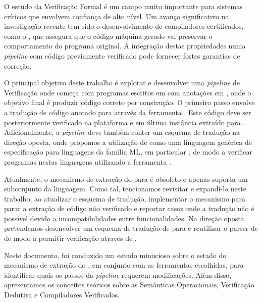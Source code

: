 
%

O estudo da Verificação Formal é um campo muito importante para sistemas críticos que
envolvem confiança de alto nível. Um avanço significativo na investigação recente tem sido o
desenvolvimento de compiladores certificados, como o \cml, que assegura que o código máquina
gerado vai preservar o comportamento do programa original. A integração destas propriedades
numa \textit{pipeline} com código previamente verificado pode fornecer fortes garantias de correção.

O principal objetivo deste trabalho é explorar e desenvolver uma \textit{pipeline} de Verificação
onde começa com programas escritos em \ocaml com anotações em \gospel, onde o objetivo final
é produzir código \cml correto por construção. O primeiro passo envolve a tradução de código 
\ocaml anotado para \whyml através da ferramenta \cameleer. Este código \whyml deve ser 
posteriormente verificado na plataforma \whythree e em última instância extraído para \cml.
Adicionalmente, a \textit{pipeline} deve também conter um esquema de tradução na direção oposta,
onde propomos a utilização de \gospel como uma linguagem genérica de especificação para linguagens
da família ML, em particular \cml, de modo a verificar programas nestas linguagens utilizando
a ferramenta \cameleer.

Atualmente, o mecanismo de extração do \whythree para \cml é obsoleto e apenas suporta
um subconjunto da linguagem. Como tal, tencionamos revisitar e expandí-lo neste trabalho,
ao atualizar o esquema de tradução, implementar o mecanismo para parar a extração de
código não verificado e reportar casos onde a tradução não é possível devido a incompatibilidades
entre funcionalidades. Na direção oposta pretendemos desenvolver um esquema de tradução de 
\cml para \ocaml e reutilizar o parser de \gospel de modo a permitir verificação através de \cameleer.

Neste documento, foi conduzido um estudo minucioso sobre o estado do mecanismo de
extração do \whythree, em conjunto com as ferramentas escolhidas, para identificar quais 
os passos da \textit{pipeline} requerem modificações. Além disso, apresentamos
os conceitos teóricos sobre as Semânticas Operacionais, Verificação Dedutiva e Compiladores
Verificados.


